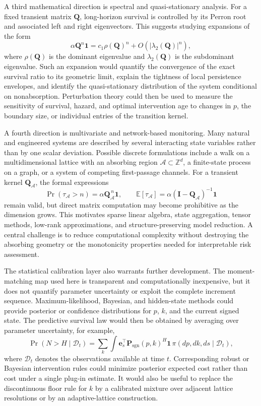 \documentclass[pdflatex,sn-mathphys-num]{sn-jnl}
\theoremstyle{definition}
\newcommand{\E}{\mathbb{E}}
\numberwithin{equation}{section}
\begin{document}
A third mathematical direction is spectral and quasi-stationary analysis. For
a fixed transient matrix \(\mathbf Q\), long-horizon survival is controlled by
its Perron root and associated left and right eigenvectors. This suggests
studying expansions of the form
\[
\alpha\mathbf Q^n\mathbf 1
=
c_1\rho(\mathbf Q)^n
+
O\!\left(|\lambda_2(\mathbf Q)|^n\right),
\]
where \(\rho(\mathbf Q)\) is the dominant eigenvalue and
\(\lambda_2(\mathbf Q)\) is the subdominant eigenvalue. Such an expansion would
quantify the convergence of the exact survival ratio to its geometric limit,
explain the tightness of local persistence envelopes, and identify the
quasi-stationary distribution of the system conditional on nonabsorption.
Perturbation theory could then be used to measure the sensitivity of survival,
hazard, and optimal intervention age to changes in \(p\), the boundary size,
or individual entries of the transition kernel.

A fourth direction is multivariate and network-based monitoring. Many natural
and engineered systems are described by several interacting state variables
rather than by one scalar deviation. Possible discrete formulations include a
walk on a multidimensional lattice with an absorbing region
\(\mathcal A\subset\mathbb Z^d\), a finite-state process on a graph, or a system
of competing first-passage channels. For a transient kernel
\(\mathbf Q_{\mathcal A}\), the formal expressions
\[
\Pr(\tau_{\mathcal A}>n)
=
\alpha\mathbf Q_{\mathcal A}^{\,n}\mathbf 1,
\qquad
\E[\tau_{\mathcal A}]
=
\alpha(\mathbf I-\mathbf Q_{\mathcal A})^{-1}\mathbf 1
\]
remain valid, but direct matrix computation may become prohibitive as the
dimension grows. This motivates sparse linear algebra, state aggregation,
tensor methods, low-rank approximations, and structure-preserving model
reduction. A central challenge is to reduce computational complexity without
destroying the absorbing geometry or the monotonicity properties needed for
interpretable risk assessment.

The statistical calibration layer also warrants further development. The
moment-matching map used here is transparent and computationally inexpensive,
but it does not quantify parameter uncertainty or exploit the complete
increment sequence. Maximum-likelihood, Bayesian, and hidden-state methods
could provide posterior or confidence distributions for \(p\), \(k\), and the
current signed state. The predictive survival law would then be obtained by
averaging over parameter uncertainty, for example,
\[
\Pr(N>H\mid\mathcal D_t)
=
\sum_k\int
\mathbf e_{s}^{\top}
\mathbf P_{\mathrm{sgn}}(p,k)^H\mathbf 1\,
\pi(dp,dk,ds\mid\mathcal D_t),
\]
where \(\mathcal D_t\) denotes the observations available at time \(t\).
Corresponding robust or Bayesian intervention rules could minimize posterior
expected cost rather than cost under a single plug-in estimate. It would also
be useful to replace the discontinuous floor rule for \(k\) by a calibrated
mixture over adjacent lattice resolutions or by an adaptive-lattice
construction.
\end{document}
